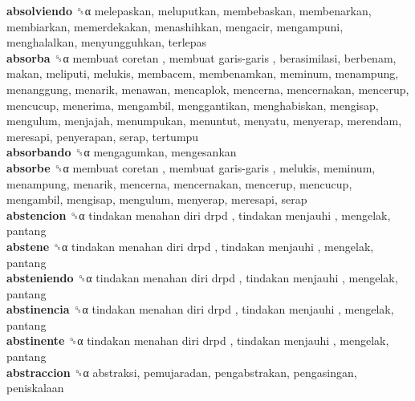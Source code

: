 \textbf{absolviendo} ␝α  melepaskan, meluputkan, membebaskan, membenarkan, membiarkan, memerdekakan, menashihkan, mengacir, mengampuni, menghalalkan, menyungguhkan, terlepas  \\
\textbf{absorba} ␝α   membuat coretan ,  membuat garis-garis , berasimilasi, berbenam, makan, meliputi, melukis, membacem, membenamkan, meminum, menampung, menanggung, menarik, menawan, mencaplok, mencerna, mencernakan, mencerup, mencucup, menerima, mengambil, menggantikan, menghabiskan, mengisap, mengulum, menjajah, menumpukan, menuntut, menyatu, menyerap, merendam, meresapi, penyerapan, serap, tertumpu  \\
\textbf{absorbando} ␝α  mengagumkan, mengesankan  \\
\textbf{absorbe} ␝α   membuat coretan ,  membuat garis-garis , melukis, meminum, menampung, menarik, mencerna, mencernakan, mencerup, mencucup, mengambil, mengisap, mengulum, menyerap, meresapi, serap  \\
\textbf{abstencion} ␝α   tindakan menahan diri drpd ,  tindakan menjauhi , mengelak, pantang  \\
\textbf{abstene} ␝α   tindakan menahan diri drpd ,  tindakan menjauhi , mengelak, pantang  \\
\textbf{absteniendo} ␝α   tindakan menahan diri drpd ,  tindakan menjauhi , mengelak, pantang  \\
\textbf{abstinencia} ␝α   tindakan menahan diri drpd ,  tindakan menjauhi , mengelak, pantang  \\
\textbf{abstinente} ␝α   tindakan menahan diri drpd ,  tindakan menjauhi , mengelak, pantang  \\
\textbf{abstraccion} ␝α  abstraksi, pemujaradan, pengabstrakan, pengasingan, peniskalaan  \\
